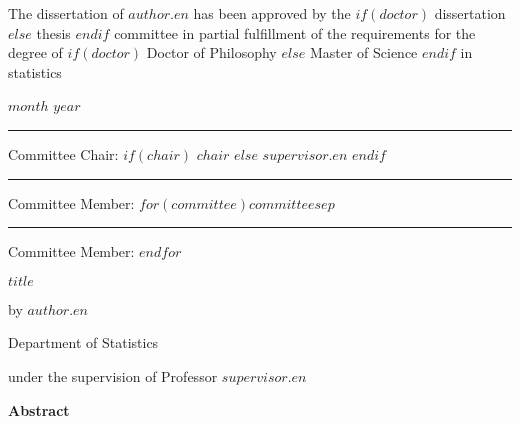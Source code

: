 \documentclass[$fontsize$]{report}
\begin{document}
\newpage
\begin{center}
\vfill
{\fontsize{16pt}{16pt}\selectfont
The dissertation of $author.en$ has been approved by the
$if(doctor)$ dissertation
$else$ thesis
$endif$ committee in partial fulfillment of the requirements for the degree of
$if(doctor)$ Doctor of Philosophy
$else$ Master of Science
$endif$ in statistics\par}
\vspace{1cm}
{\fontsize{14pt}{14pt}\selectfont $month$ $year$ \par}
\vfill
\rule{.6\textwidth}{0.5pt}\par %
{\fontsize{14pt}{14pt}\selectfont Committee Chair: $if(chair)$ $chair$ $else$ $supervisor.en$ $endif$ \par}
\vspace{1.4cm}
\rule{.6\textwidth}{0.5pt}\par %
{\fontsize{14pt}{14pt}\selectfont Committee Member: $for(committee)$$committee$$sep$\par}
\vspace{1.4cm}
\rule{.6\textwidth}{0.5pt}\par %
{\fontsize{14pt}{14pt}\selectfont Committee Member: $endfor$ \par}
\vspace{1cm}
\end{center}


\newpage
{} %
\begin{center}
\onehalfspacing
\LARGE $title$ %
\par\vspace{20pt}

\normalsize\doublespacing
by $author.en$\par %
Department of Statistics\par
under the supervision of Professor $supervisor.en$ %
\par\vspace{20pt}
\large \textbf{Abstract}
\end{center}
\normalsize\doublespacing
\end{document}
